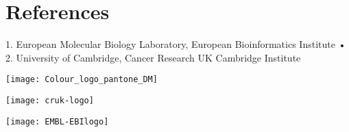 \documentclass[a0,portrait]{a0poster}
\begin{document}
\section*{References}
\begin{multicols}{2}
    \renewcommand\section[2]{}
    
\end{multicols}

\vfill
\noindent
\begin{center}
\normalsize%
1. European Molecular Biology Laboratory, European Bioinformatics Institute •
2. University of Cambridge, Cancer Research UK Cambridge Institute
\end{center}
\vspace{1cm}

\noindent
\begin{minipage}[][][b]{0.3\textwidth}
    \centering
    \texttt{[image: Colour\_logo\_pantone\_DM]}
\end{minipage}%
\hfill%
\begin{minipage}[][][b]{0.3\textwidth}
    \centering
    \texttt{[image: cruk-logo]}
\end{minipage}%
\hfill%
\begin{minipage}[][][b]{0.3\textwidth}
    \centering
    \texttt{[image: EMBL-EBIlogo]}
\end{minipage}%
\end{document}
